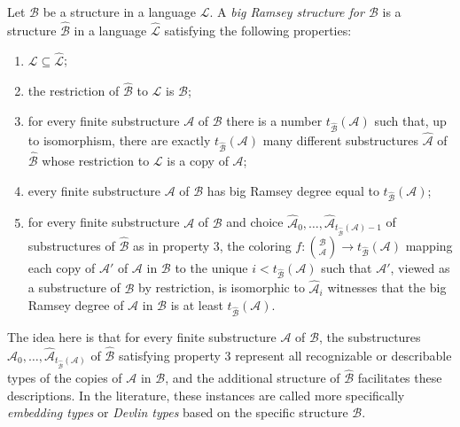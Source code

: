 \begin{definition}\label{def:big-ramsey-structure}
	Let $\mathcal{B}$ be a structure in a language $\mathscr{L}$. A \emph{big Ramsey structure for $\mathcal{B}$} is a structure $\hat{\mathcal{B}}$ in a language $\hat{\mathscr{L}}$ satisfying the following properties:
	\begin{enumerate}
		\item $\mathscr{L} \subseteq \hat{\mathscr{L}}$;
		\item the restriction of $\hat{\mathcal{B}}$ to $\mathscr{L}$ is $\mathcal{B}$;
		\item for every finite substructure $\mathcal{A}$ of $\mathcal{B}$ there is a number $t_{\hat{\mathcal{B}}}(\mathcal{A})$ such that, up to isomorphism, there are exactly $t_{\hat{\mathcal{B}}}(\mathcal{A})$ many different substructures $\hat{\mathcal{A}}$ of $\hat{\mathcal{B}}$ whose restriction to $\mathscr{L}$ is a copy of $\mathcal{A}$;
		\item every finite substructure $\mathcal{A}$ of $\mathcal{B}$ has big Ramsey degree equal to $t_{\hat{\mathcal{B}}}(\mathcal{A})$;
		\item for every finite substructure $\mathcal{A}$ of $\mathcal{B}$ and choice $\hat{\mathcal{A}}_0,\ldots,\hat{\mathcal{A}}_{t_{\hat{\mathcal{B}}}(\mathcal{A})-1}$ of substructures of $\hat{\mathcal{B}}$ as in property 3, the coloring $f: {\mathcal{B} \choose \mathcal{A}} \to t_{\hat{\mathcal{B}}}(\mathcal{A})$ mapping each copy of $\mathcal{A}'$ of $\mathcal{A}$ in $\mathcal{B}$ to the unique $i < t_{\hat{\mathcal{B}}}(\mathcal{A})$ such that $\mathcal{A}'$, viewed as a substructure of $\hat{\mathcal{B}}$ by restriction, is isomorphic to $\hat{\mathcal{A}}_i$ witnesses that the big Ramsey degree of $\mathcal{A}$ in $\mathcal{B}$ is at least $t_{\hat{\mathcal{B}}}(\mathcal{A})$.
	\end{enumerate}
\end{definition}

\noindent The idea here is that for every finite substructure $\mathcal{A}$ of $\mathcal{B}$, the substructures $\hat{\mathcal{A}}_0,\ldots,\hat{\mathcal{A}}_{t_{\hat{\mathcal{B}}}(\mathcal{A})}$ of $\hat{\mathcal{B}}$ satisfying property 3 represent all recognizable or describable types of the copies of $\mathcal{A}$ in $\mathcal{B}$, and the additional structure of $\hat{\mathcal{B}}$ facilitates these descriptions. In the literature, these instances are called more specifically \emph{embedding types} or \emph{Devlin types} based on the specific structure $\mathcal{B}$.

